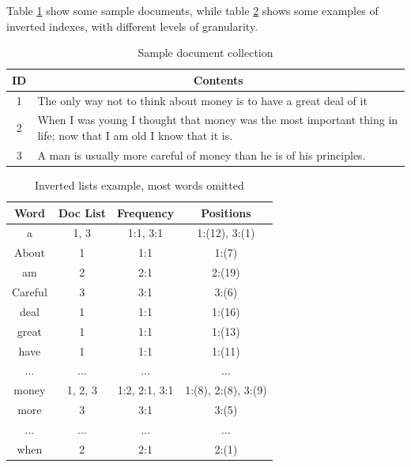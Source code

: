 Table \ref{tab:sample_docs} show some sample documents, while table \ref{tab:inverted_lists} shows some examples of inverted indexes, with different levels of granularity.

\begin{table}[ht]
    \begin{center}
        \begin{tabularx}{\textwidth}{|c|X|}
            \hline
            \textbf{ID} & \multicolumn{1}{c|}{\textbf{Contents}}  \\ \hline
            1 & The only way not to think about money is to have a great deal of it \\ \hline
            2 & When I was young I thought that money was the most important thing in life; now that I am old I know that it is. \\ \hline
            3 & A man is usually more careful of money than he is of his principles.\\ \hline
        \end{tabularx}
        \caption{Sample document collection\label{tab:sample_docs}}
    \end{center}
\end{table}

\begin{table}[ht]
    \begin{center}
        \begin{tabular}{|c|c|c|c|}
            \hline
            \textbf{Word} & \textbf{Doc List} & \textbf{Frequency} & \textbf{Positions} \\ \hline
            a & 1, 3 & 1:1, 3:1 & 1:(12), 3:(1) \\ \hline
            About & 1 & 1:1 & 1:(7) \\ \hline
            am & 2 & 2:1 & 2:(19) \\ \hline
            Careful & 3 & 3:1 & 3:(6) \\ \hline
            deal & 1 & 1:1 & 1:(16) \\ \hline
            great & 1 & 1:1 & 1:(13) \\ \hline
            have & 1 & 1:1 & 1:(11) \\ \hline
            ... & ... & ... & ... \\ \hline
            money & 1, 2, 3 & 1:2, 2:1, 3:1 & 1:(8), 2:(8), 3:(9) \\ \hline
            more & 3 & 3:1 & 3:(5) \\ \hline
            ... & ... & ... & ... \\ \hline
            when & 2 & 2:1 & 2:(1) \\ \hline
        \end{tabular}
        \caption{Inverted lists example, most words omitted\label{tab:inverted_lists}} 
    \end{center}
\end{table}


